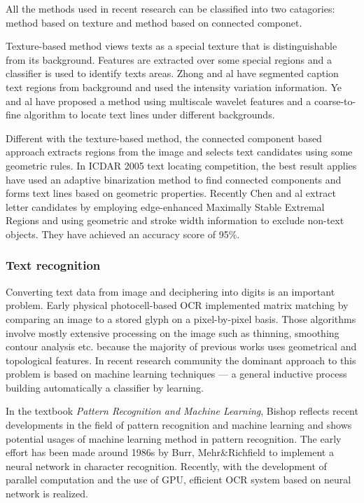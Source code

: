\documentclass[paper=a4, french, 11pt]{scrartcl}
\begin{document}
All the methods used in recent research can be classified into two catagories: method based on texture and method based on connected componet.

Texture-based method views texts as a special texture that is distinguishable from its background. Features are extracted over some special regions and a classifier is used to identify texts areas. Zhong and al have segmented caption text regions from background and used the intensity variation information. Ye and al have proposed a method using multiscale wavelet features and a coarse-to-fine algorithm to locate text lines under different backgrounds.

Different with the texture-based method, the connected component based approach extracts regions from the image and selects text candidates using some geometric rules. In ICDAR 2005 text locating competition, the best result applies have used an adaptive binarization method to find connected components and forms text lines based on geometric properties. Recently Chen and al extract letter candidates by employing edge-enhanced Maximally Stable Extremal Regions and using geometric and stroke width information to exclude non-text objects. They have achieved an accuracy score of 95\%.

\subsubsection{Text recognition}
Converting text data from image and deciphering into digits is an important problem. Early physical photocell-based OCR implemented matrix matching by comparing an image to a stored glyph on a pixel-by-pixel basis. Those algorithms involve mostly extensive processing on the image such as thinning, smoothing contour analysis etc. because the majority of previous works uses geometrical and topological features. In recent research community the dominant approach to this problem is based on machine learning techniques --- a general inductive process building automatically a classifier by learning.

In the textbook \textit{Pattern Recognition and Machine Learning}, Bishop reflects recent developments in the field of pattern recognition and machine learning and shows potential usages of machine learning method in pattern recognition. The early effort has been made around 1986s by Burr, Mehr\&Richfield to implement a neural network in character recognition. Recently, with the development of parallel computation and the use of GPU, efficient OCR system based on neural network is realized. 
\end{document}
